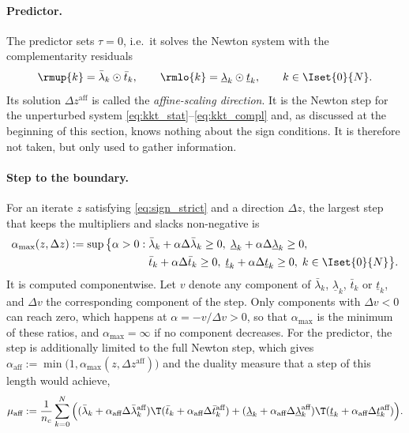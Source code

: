 \paragraph{Predictor.}
The predictor sets $\tau = 0$, i.e.\ it solves the Newton system with the complementarity residuals
\[
    \rmup{k} = \bar{\lambda}_k \odot \bar{t}_k ,
    \qquad
    \rmlo{k} = \underline{\lambda}_k \odot \underline{t}_k ,
    \qquad k\in\Iset{0}{N}.
\]
Its solution $\Delta z^{\text{aff}}$ is called the \textit{affine-scaling direction}.
It is the Newton step for the unperturbed system \eqref{eq:kkt_stat}--\eqref{eq:kkt_compl} and, as discussed at the beginning of this section, knows nothing about the sign conditions.
It is therefore not taken, but only used to gather information.

\paragraph{Step to the boundary.}
For an iterate $z$ satisfying \eqref{eq:sign_strict} and a direction $\Delta z$, the largest step that keeps the multipliers and slacks non-negative is
\begin{equation} \label{eq:alpha_max}
\begin{aligned}
    \alpha_{\max}(z, \Delta z) := \sup\big\{ \alpha > 0 : \;
        & \bar{\lambda}_k + \alpha\Delta\bar{\lambda}_k \geq 0,\;
          \underline{\lambda}_k + \alpha\Delta\underline{\lambda}_k \geq 0, \\
        & \bar{t}_k + \alpha\Delta\bar{t}_k \geq 0,\;
          \underline{t}_k + \alpha\Delta\underline{t}_k \geq 0,\;
          k\in\Iset{0}{N} \big\} .
\end{aligned}
\end{equation}
It is computed componentwise.
Let $v$ denote any component of $\bar{\lambda}_k$, $\underline{\lambda}_k$, $\bar{t}_k$ or $\underline{t}_k$, and $\Delta v$ the corresponding component of the step.
Only components with $\Delta v < 0$ can reach zero, which happens at $\alpha = -v / \Delta v > 0$, so that $\alpha_{\max}$ is the minimum of these ratios, and $\alpha_{\max} = \infty$ if no component decreases.
For the predictor, the step is additionally limited to the full Newton step, which gives $\alpha_{\text{aff}} := \min\big(1, \alpha_{\max}(z, \Delta z^{\text{aff}})\big)$ and the duality measure that a step of this length would achieve,
\[
    \mu_{\text{aff}} := \frac{1}{n_c}\sum_{k=0}^{N} \Big(
        (\bar{\lambda}_k + \alpha_{\text{aff}}\Delta\bar{\lambda}_k^{\text{aff}})\T (\bar{t}_k + \alpha_{\text{aff}}\Delta\bar{t}_k^{\text{aff}})
      + (\underline{\lambda}_k + \alpha_{\text{aff}}\Delta\underline{\lambda}_k^{\text{aff}})\T (\underline{t}_k + \alpha_{\text{aff}}\Delta\underline{t}_k^{\text{aff}})
    \Big) .
\]

